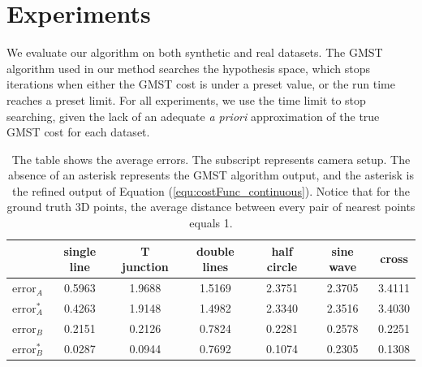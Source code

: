 
\section{Experiments}
We evaluate our algorithm on both synthetic and real datasets.
The GMST algorithm used in our method \cite{Ferreira_ESWA2012} searches the hypothesis space, which stops iterations when either the GMST cost is under a preset value, or the run time reaches a preset limit. For all experiments, we use the time limit to stop searching, given the lack of an adequate {\em a priori} approximation of the true  GMST cost for each dataset.
\begin{table}
\centering
\begin{tabular}{|c|c|c|c|c|c|c|}  \hline
               & single line & T junction & double lines & half circle & sine wave & cross \\
  \hline
  $\text{error}_A$ & 0.5963 & 1.9688 & 1.5169 & 2.3751  & 2.3705 & 3.4111\\
  \hline
  $\text{error}^*_A$ & 0.4263 & 1.9148 & 1.4982 & 2.3340  & 2.3516 & 3.4030 \\
  \hline
  $\text{error}_B$ & 0.2151 & 0.2126 & 0.7824 & 0.2281& 0.2578 &0.2251 \\
  \hline
  $\text{error}^*_B$ & 0.0287 & 0.0944 & 0.7692 & 0.1074 & 0.2305 & 0.1308\\
  \hline
\end{tabular}
\caption{ The table shows the average errors. The subscript represents camera setup. The absence of an asterisk represents the GMST algorithm output, and the asterisk is the refined output of Equation (\ref{equ:costFunc_continuous}). Notice that for the ground truth 3D points, the average distance between every pair of nearest points equals 1. }
\label{fig:syntheticDataResult}
\end{table}


